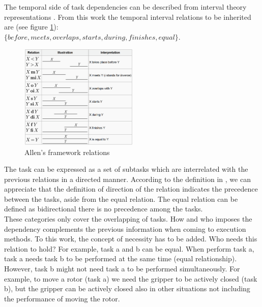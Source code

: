 \documentclass[a4paper,10pt]{article}
\begin{document}
The temporal side of task dependencies can be described from interval theory representations \cite{1}.
From this work the temporal interval relations to be inherited are (see figure \ref{fig:allens_framework}): \\
$\{ before ,meets ,overlaps ,starts ,during ,finishes ,equal \}$.
\\
\begin{figure}[h]
    \centering
    \includegraphics[width=0.5\textwidth]{allens_framework.png}
    \caption{Allen's framework relations}
    \label{fig:allens_framework}
\end{figure}


The task can be expressed as a set of subtasks which are interrelated with the previous relations in a directed manner. According to the definition in \cite{1}, we can appreciate that the definition of direction of the relation indicates the precedence between the tasks, aside from the equal relation. The equal relation can be defined as bidirectional there is no precedence among the tasks.
\\
These categories only cover the overlapping of tasks. How and who imposes the dependency complements the previous information when coming to execution methods.  
To this work, the concept of necessity has to be added. Who needs this relation to hold? 
For example, task a and b can be equal. When perform task a, task a needs task b to be performed at the same time (equal relationship). However, task b might not need task a to be performed simultaneously. For example, to move a rotor (task a) we need the gripper to be actively closed (task b), but the gripper can be actively closed also in other situations not including the performance of moving the rotor. 
\\
\end{document}
